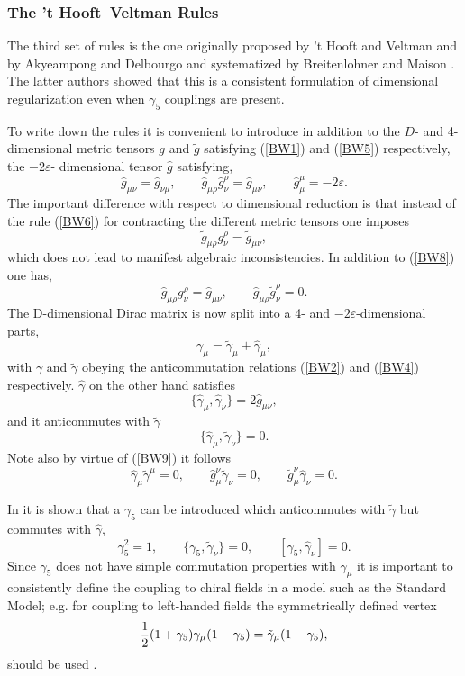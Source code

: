 \documentclass[12pt]{article}
\def\gat{\tilde{\gamma}}
\def\gh{\hat{g}}
\def\gt{\tilde{g}}
\def\gah{\hat{\gamma}}
\def\ga{\gamma}
\def\gaf{\gamma_{5}}
\newcommand{\be}{\begin{equation}}
\newcommand{\ee}{\end{equation}}
\begin{document}
\begin{itemize}
 \subsubsection{The 't Hooft--Veltman Rules}
 The third set of rules is the one originally proposed by 't Hooft and
 Veltman
 \cite{HV} and by Akyeampong and Delbourgo \cite{AD} and systematized by
 Breitenlohner and Maison \cite{BM}. The latter authors showed that this is
 a consistent formulation of dimensional regularization even when 
$\gamma_5$
 couplings are present.
 
 To write down the rules it is convenient to introduce in addition to the
 $D$- and 4- dimensional metric tensors $g$ and $\gt$
 satisfying (\ref{BW1}) and (\ref{BW5}) respectively, 
the $-2\varepsilon$- dimensional tensor $\gh$ satisfying,
\be\label{BW7}
 \gh_{\mu \nu} = \gh_{\nu \mu}, \qquad
 \gh_{\mu \rho} \gh^{\rho}_{\nu} = \gh_{\mu \nu}, \qquad
 \gh_{\mu}^{\mu} = -2\varepsilon.
\ee
 The important difference with respect to dimensional reduction is that
 instead of the rule (\ref{BW6}) for contracting
 the different metric tensors one imposes
\be\label{BW8}
 \gt_{\mu \rho} g^{\rho}_{\nu} = \gt_{\mu \nu},
\ee
 which does not lead to manifest algebraic inconsistencies. In addition to
 (\ref{BW8}) one has,
\be\label{BW9}
 \gh_{\mu \rho} g^{\rho}_{\nu} = \gh_{\mu \nu},  \qquad
 \gh_{\mu \rho} \gt^{\rho}_{\nu} = 0.
\ee
 The D-dimensional Dirac matrix
 is now split into a 4- and $-2\varepsilon$-dimensional parts,
\be\label{BW10}
  \gamma_{\mu} = \gat_{\mu} + \gah_{\mu},
\ee
 with $\gamma$ and $\gat$ obeying the anticommutation relations 
(\ref{BW2})
 and (\ref{BW4}) respectively. $\gah$ on the other hand satisfies
\be\label{BW11}
 \{ \gah_{\mu} , \gah_{\nu} \} = 2 \gh_{\mu \nu},
\ee
 and it anticommutes with $\gat$
\be\label{BW12}
 \{ \gah_{\mu} , \gat_{\nu} \} = 0.
\ee
 Note also by virtue of (\ref{BW9}) it follows
\be\label{BW13}
  \gah_{\mu} \gat^{\mu}  = 0, \qquad
  \gh_{\mu}^{ \nu} \gat_{\nu}  = 0, \qquad
  \gt_{\mu}^{ \nu} \gah_{\nu}  = 0.
\ee
 
 In \cite{BM} it is shown that a $\gamma_5$ can be introduced which
 anticommutes with $\gat$ but commutes with $\gah$,
\be\label{BW14}
 \gamma_5^{2} =1 , \qquad
 \{ \gamma_5 , \gat_{\nu} \} = 0, \qquad
 [ \gamma_5 , \gah_{\nu} ] = 0.
\ee
 Since $\gamma_5$ does not have simple commutation properties
 with $\gamma_{\mu}$ it
 is important to consistently define the coupling to chiral fields in a
 model such as the Standard Model; e.g.
 for coupling to left-handed fields the symmetrically defined vertex
\be\label{BW15}
 {{1}\over{2}} (1 + \gaf) \ga_{\mu} (1 - \gaf)  = \gat_{\mu} (1 - \gaf),
\ee
 should be used \cite{KNS}.
 

\end{itemize}
\end{document}
